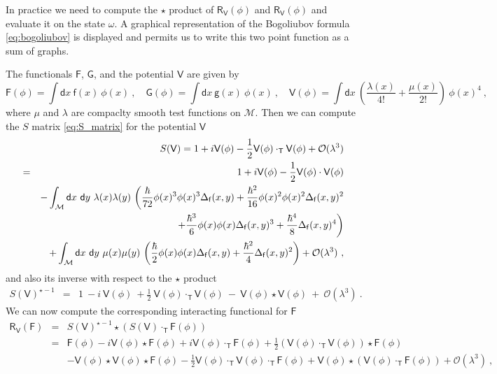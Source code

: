 \documentclass[11pt]{book}
\newcommand{\Mcal}{\mathcal{M}}
\newcommand{\Ocal}{\mathcal{O}}
\newcommand{\Fsf}{\mathsf{F}}
\newcommand{\Gsf}{\mathsf{G}}
\newcommand{\Rsf}{\mathsf{R}}
\newcommand{\Tsf}{\mathsf{T}}
\newcommand{\Vsf}{\mathsf{V}}
\newcommand{\dsf}{\mathsf{d}}
\newcommand{\fsf}{\mathsf{f}}
\newcommand{\gsf}{\mathsf{g}}
\theoremstyle{break}
\begin{document}
In practice we need to compute the $\star$ product of $\Rsf_\Vsf(\phi)$ and $\Rsf_\Vsf(\phi)$ and evaluate it on the state $\omega$. A graphical representation of the Bogoliubov formula \eqref{eq:bogoliubov} is displayed and permits us to write this two point function as a sum of graphs.


The functionals $\Fsf$, $\Gsf$, and the potential $\Vsf$ are given by
%
\begin{equation*}
\Fsf(\phi) = \int \dsf x \ \fsf(x) \ \phi(x) \ , \quad \Gsf(\phi) = \int \dsf x \ \gsf(x) \ \phi(x) \ , \quad \Vsf(\phi) = \int \dsf x \ \left( \frac{\lambda(x)}{4!} + \frac{\mu(x)}{2!} \right) \ \phi(x)^4 \ ,
\end{equation*}
%
where $\mu$ and $\lambda$ are compaclty smooth test functions on $\Mcal$. Then we can compute the $S$ matrix \eqref{eq:S_matrix} for the potential $\Vsf$
%
\begin{eqnarray*}
&& S(\Vsf) = 1 + i \Vsf(\phi) - \frac{1}{2} \Vsf(\phi) \cdot_\Tsf \Vsf(\phi) + \Ocal(\lambda^3) \\
&=&  \ 1 + i \Vsf(\phi) - \frac{1}{2} \Vsf(\phi) \cdot \Vsf(\phi) \\
&& - \int_\Mcal \dsf x \ \dsf y \ \lambda(x) \lambda(y) \ \bigg( 
\frac{\hbar}{72} \phi(x)^3 \phi(x)^3 \Delta_\fsf(x,y) + \frac{\hbar^2}{16} \phi(x)^2 \phi(x)^2 \Delta_\fsf(x,y)^2 \\ 
&& \hspace*{13pt} + \frac{\hbar^3}{6} \phi(x) \phi(x) \Delta_\fsf(x,y)^3 + \frac{\hbar^4}{8} \Delta_\fsf(x,y)^4 \bigg) \\
&& + \int_\Mcal \dsf x \ \dsf y \ \mu(x) \mu(y) \ \bigg( 
\frac{\hbar}{2} \phi(x) \phi(x) \Delta_\fsf(x,y) + \frac{\hbar^2}{4} \Delta_\fsf(x,y)^2 \bigg) + \Ocal(\lambda^3) \ , 
\end{eqnarray*}
%
and also its inverse with respect to the $\star$ product
%
\begin{eqnarray*}
S(\Vsf)^{\star -1} &=& 1 \ - i \ \Vsf(\phi) \ + \frac{1}{2} \ \Vsf(\phi) \cdot_\Tsf \Vsf(\phi) \ - \ \Vsf(\phi) \star \Vsf(\phi) \ + \ \Ocal(\lambda^3) \ .
\end{eqnarray*}
%
We can now compute the corresponding interacting functional for $\Fsf$
%
\begin{eqnarray*}
\Rsf_\Vsf(\Fsf) &=& S(\Vsf)^{\star -1} \star \left( S(\Vsf) \cdot_\Tsf \Fsf(\phi) \right) \\
&=& \Fsf(\phi) - i \Vsf(\phi) \star \Fsf(\phi) + i \Vsf(\phi) \cdot_\Tsf \Fsf(\phi) + \frac{1}{2} \left( \Vsf(\phi) \cdot_\Tsf\Vsf(\phi) \right) \star \Fsf(\phi) \\
&& - \Vsf(\phi) \star \Vsf(\phi) \star \Fsf(\phi) - \frac{1}{2} \Vsf(\phi) \cdot_\Tsf \Vsf(\phi) \cdot_\Tsf\Fsf(\phi) + \Vsf(\phi) \star \left( \Vsf(\phi) \cdot_\Tsf \Fsf(\phi) \right) + \Ocal(\lambda^3) \ ,
\end{eqnarray*}
\end{document}
